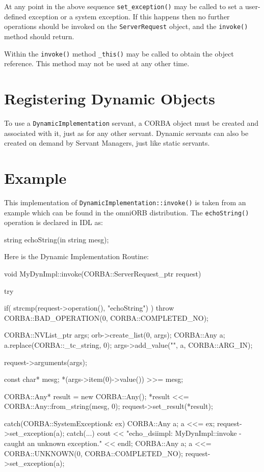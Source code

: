 \documentclass[11pt,twoside,a4paper]{book}
\newcommand{\type}[1]{\texttt{#1}}
\newcommand{\op}[1]{\texttt{#1()}}
\begin{document}
At any point in the above sequence \op{set\_exception} may be called
to set a user-defined exception or a system exception. If this happens
then no further operations should be invoked on the
\type{ServerRequest} object, and the \op{invoke} method should return.

Within the \op{invoke} method \op{\_this} may be called to obtain the
object reference. This method may not be used at any other time.


\section{Registering Dynamic Objects}

To use a \type{DynamicImplementation} servant, a CORBA object must be
created and associated with it, just as for any other servant. Dynamic
servants can also be created on demand by Servant Managers, just like
static servants.


\section{Example}

This implementation of \op{DynamicImplementation::invoke} is taken
from an example which can be found in the omniORB distribution. The
\op{echoString} operation is declared in IDL as:

\begin{idllisting}
string echoString(in string mesg);
\end{idllisting}



\noindent Here is the Dynamic Implementation Routine:

\begin{cxxlisting}
void
MyDynImpl::invoke(CORBA::ServerRequest_ptr request)
{
  try {
    if( strcmp(request->operation(), "echoString") )
      throw CORBA::BAD_OPERATION(0, CORBA::COMPLETED_NO);

    CORBA::NVList_ptr args;
    orb->create_list(0, args);
    CORBA::Any a;
    a.replace(CORBA::_tc_string, 0);
    args->add_value("", a, CORBA::ARG_IN);

    request->arguments(args);

    const char* mesg;
    *(args->item(0)->value()) >>= mesg;

    CORBA::Any* result = new CORBA::Any();
    *result <<= CORBA::Any::from_string(mesg, 0);
    request->set_result(*result);
  }
  catch(CORBA::SystemException& ex){
    CORBA::Any a;
    a <<= ex;
    request->set_exception(a);
  }
  catch(...){
    cout << "echo_dsiimpl: MyDynImpl::invoke - caught an unknown exception."
	 << endl;
    CORBA::Any a;
    a <<= CORBA::UNKNOWN(0, CORBA::COMPLETED_NO);
    request->set_exception(a);
  }
}
\end{cxxlisting}
\end{document}
